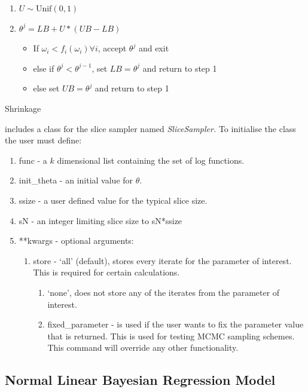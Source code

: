 \documentclass[article]{jss}
\begin{document}
%
\begin{algorithm}[H]
\begin{enumerate}
\item $U\sim\mbox{Unif}(0,1)$ 
\item $\theta^{j}=LB+U*(UB-LB)$

\begin{itemize}
\item If $\omega_{i}<f_{i}(\omega_{i})\forall i$, accept $\theta^{j}$
and exit 
\item else if $\theta^{j}<\theta^{j-1}$, set $LB=\theta^{j}$ and return
to step 1 
\item else set $UB=\theta^{j}$ and return to step 1 
\end{itemize}
\end{enumerate}
\caption{Shrinkage}
\label{alg:shrinkage}
\end{algorithm}


 includes a class for the slice sampler named \emph{SliceSampler.
}To initialise the class the user must define: 
\begin{enumerate}
\item func - a $k$ dimensional list containing the set of log functions. 
\item init\_theta - an initial value for $\theta$. 
\item ssize - a user defined value for the typical slice size. 
\item sN - an integer limiting slice size to sN{*}ssize 
\item {*}{*}kwargs - optional arguments:

\begin{enumerate}
\item store - `all' (default), stores every iterate for the parameter of
interest. This is required for certain calculations.

\begin{enumerate}
\item `none', does not store any of the iterates from the parameter of interest. 
\item fixed\_parameter - is used if the user wants to fix the
  parameter value that is returned. This is used for testing MCMC
  sampling schemes.  This command will override any other
  functionality.
\end{enumerate}
\end{enumerate}
\end{enumerate}

\subsection{Normal Linear Bayesian Regression Model}
\end{document}
